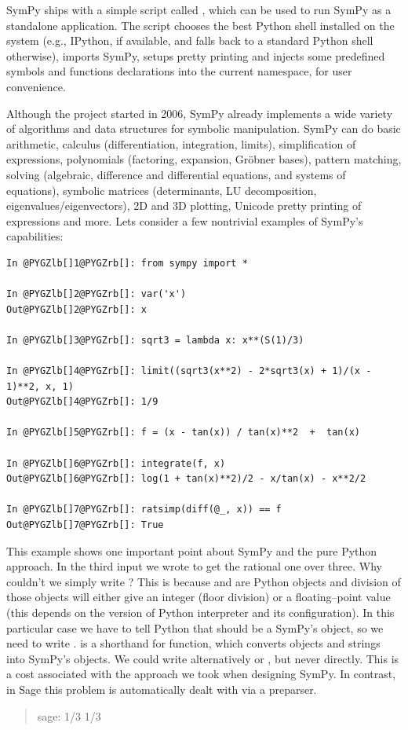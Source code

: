 SymPy ships with a simple script called , which can be used
to run SymPy as a standalone application. The script chooses the best
Python shell installed on the system (e.g., IPython, if available, and
falls back to a standard Python shell otherwise), imports SymPy,
setups pretty printing and injects some predefined symbols and
functions declarations into the current namespace, for user
convenience.

Although the project started in 2006, SymPy already implements a wide
variety of algorithms and data structures for symbolic
manipulation. SymPy can do basic arithmetic, calculus
(differentiation, integration, limits), simplification of expressions,
polynomials (factoring, expansion, Gröbner bases), pattern matching,
solving (algebraic, difference and differential equations, and systems
of equations), symbolic matrices (determinants, LU decomposition,
eigenvalues/eigenvectors), 2D and 3D plotting, Unicode pretty printing
of expressions and more. Lets consider a few nontrivial examples of
SymPy's capabilities:

\begin{Verbatim}[commandchars=@\[\]]
In @PYGZlb[]1@PYGZrb[]: from sympy import *

In @PYGZlb[]2@PYGZrb[]: var('x')
Out@PYGZlb[]2@PYGZrb[]: x

In @PYGZlb[]3@PYGZrb[]: sqrt3 = lambda x: x**(S(1)/3)

In @PYGZlb[]4@PYGZrb[]: limit((sqrt3(x**2) - 2*sqrt3(x) + 1)/(x - 1)**2, x, 1)
Out@PYGZlb[]4@PYGZrb[]: 1/9

In @PYGZlb[]5@PYGZrb[]: f = (x - tan(x)) / tan(x)**2  +  tan(x)

In @PYGZlb[]6@PYGZrb[]: integrate(f, x)
Out@PYGZlb[]6@PYGZrb[]: log(1 + tan(x)**2)/2 - x/tan(x) - x**2/2

In @PYGZlb[]7@PYGZrb[]: ratsimp(diff(@_, x)) == f
Out@PYGZlb[]7@PYGZrb[]: True
\end{Verbatim}
\noindent
This example shows one important point about SymPy and the pure Python
approach. In the third input we wrote  to get the rational
one over three. Why couldn't we simply write ? This is because
 and  are Python objects and division of those objects will
either give an integer (floor division) or a floating--point value
(this depends on the version of Python interpreter and its
configuration). In this particular case we have to tell Python that
 should be a SymPy's object, so we need to write .  
is a shorthand for  function, which converts objects
and strings into SymPy's objects. We could write alternatively
 or , but never  directly. This
is a cost associated with the approach we took when designing SymPy.
In contrast, in Sage this problem is automatically dealt with via a
preparser.
\begin{quote}

sage: 1/3
1/3
\end{quote}

